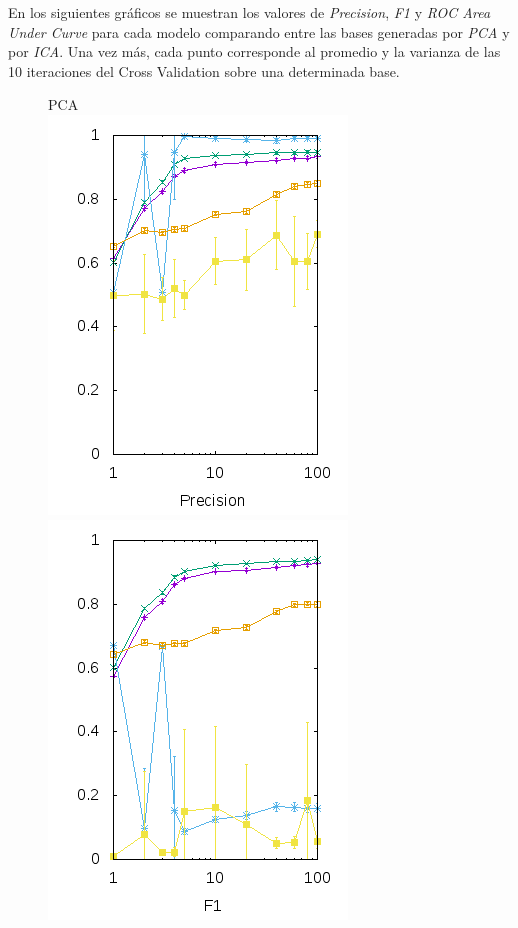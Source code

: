 \documentclass[10pt, a4paper]{article}
\begin{document}
En los siguientes gráficos se muestran los valores de \textit{Precision}, \textit{F1} y \textit{ROC Area Under Curve} para cada modelo comparando entre las bases generadas por \textit{PCA} y por \textit{ICA}. Una vez más, cada punto corresponde al promedio y la varianza de las 10 iteraciones del Cross Validation sobre una determinada base.

\begin{figure}[H]
  \begin{minipage}{1\textwidth}
  \center PCA\\
	\includegraphics[scale=0.5]{../src/data/prpca.png}
	\includegraphics[scale=0.5]{../src/data/f1pca.png}

\end{minipage}
\end{figure}
\end{document}
